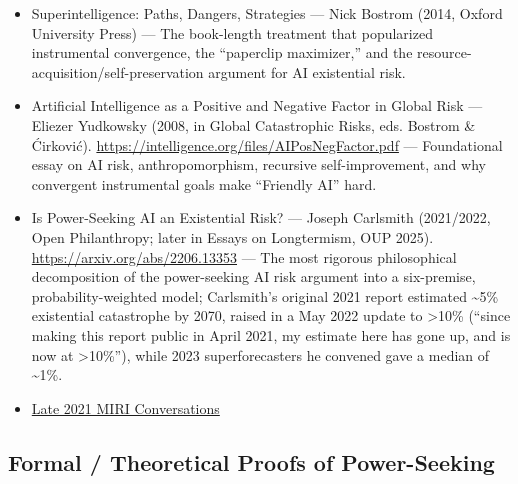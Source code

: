 \documentclass[11pt]{article}
\begin{document}
\begin{itemize}
  \item Superintelligence: Paths, Dangers, Strategies --- Nick Bostrom (2014, Oxford University Press) --- The book-length treatment that popularized instrumental convergence, the ``paperclip maximizer,'' and the resource-acquisition/self-preservation argument for AI existential risk.
  \item Artificial Intelligence as a Positive and Negative Factor in Global Risk --- Eliezer Yudkowsky (2008, in Global Catastrophic Risks, eds. Bostrom \& Ćirković). \href{https://intelligence.org/files/AIPosNegFactor.pdf}{https://intelligence.org/files/AIPosNegFactor.pdf} --- Foundational essay on AI risk, anthropomorphism, recursive self-improvement, and why convergent instrumental goals make ``Friendly AI'' hard.
  \item Is Power-Seeking AI an Existential Risk? --- Joseph Carlsmith (2021/2022, Open Philanthropy; later in Essays on Longtermism, OUP 2025). \href{https://arxiv.org/abs/2206.13353}{https://arxiv.org/abs/2206.13353} --- The most rigorous philosophical decomposition of the power-seeking AI risk argument into a six-premise, probability-weighted model; Carlsmith's original 2021 report estimated \textasciitilde{}5\% existential catastrophe by 2070, raised in a May 2022 update to >10\% (``since making this report public in April 2021, my estimate here has gone up, and is now at >10\%''), while 2023 superforecasters he convened gave a median of \textasciitilde{}1\%.
  \item \href{https://intelligence.org/late-2021-miri-conversations/}{Late 2021 MIRI Conversations}
\end{itemize}

\subsection*{Formal / Theoretical Proofs of Power-Seeking}
\end{document}
